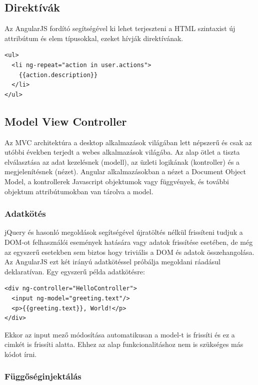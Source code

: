 \subsection{Direktívák}

Az AngularJS fordító segítségével ki lehet terjeszteni a HTML szintaxist új attribútum és elem típusokkal, ezeket hívják direktívának. 

\lstset{language=HTML}
\begin{lstlisting}[frame=single]  
<ul>
  <li ng-repeat="action in user.actions">
    {{action.description}}
  </li>
</ul>
\end{lstlisting}

\subsection{Model View Controller}

Az MVC architektúra a desktop alkalmazások világában lett népszerű és csak az utóbbi években terjedt a webes alkalmazások világába. Az alap ötlet a tiszta elválasztása az adat kezelésnek (modell), az üzleti logikának (kontroller) és a megjelenítésnek (nézet). Angular alkalmazásokban a nézet a Document Object Model, a kontrollerek Javascript objektumok vagy függvények, és további objektum attribútumokban van tárolva a model.  

\subsubsection{Adatkötés}

jQuery és hasonló megoldások segítségével újratöltés nélkül frissíteni tudjuk a DOM-ot felhasználói események hatására vagy adatok frissítése esetében, de még az egyszerű esetekben sem biztos hogy triviális a DOM és adatok összehangolása. Az AngularJS ezt két irányú adatkötéssel próbálja megoldani ráadásul deklaratívan. Egy egyszerű példa adatkötésre:

\lstset{language=HTML}
\begin{lstlisting}[frame=single]  
<div ng-controller="HelloController">
  <input ng-model="greeting.text"/>
  <p>{{greeting.text}}, World!</p>
</div>
\end{lstlisting}
Ekkor az input mező módosítása automatikusan a model-t is frissíti és ez a cimkét is frissíti alatta. Ehhez az alap funkcionalitáshoz nem is szükséges más kódot írni.


\subsubsection{Függőséginjektálás}

